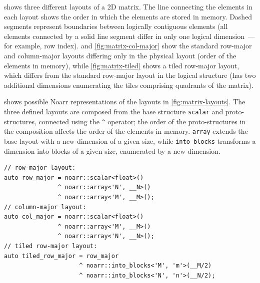  shows three different layouts of a 2D matrix.
The line connecting the elements in each layout shows the order in which the elements are stored in memory. Dashed segments represent boundaries between logically contiguous elements (all elements connected by a solid line segment differ in only one logical dimension~--- for example, row index).
 and \cref{fig:matrix-col-major} show the standard row-major and column-major layouts differing only in the physical layout (order of the elements in memory), while \cref{fig:matrix-tiled} shows a tiled row-major layout, which differs from the standard row-major layout in the logical structure (has two additional dimensions enumerating the tiles comprising quadrants of the matrix).


 shows possible Noarr representations of the layouts in \cref{fig:matrix-layouts}. The three defined layouts are composed from the base structure \lstinline{scalar} and proto-structures, connected using the \lstinline{^} operator; the order of the proto-structures in the composition affects the order of the elements in memory. \lstinline{array} extends the base layout with a new dimension of a given size, while \lstinline{into_blocks} transforms a dimension into blocks of a given size, enumerated by a new dimension.

\begin{lstlisting}[style=C++, caption={Noarr representations of the layouts in \cref{fig:matrix-layouts}}, label={lst:matrix-layouts}]
// row-major layout:
auto row_major = noarr::scalar<float>()
               ^ noarr::array<'N', __N>()
               ^ noarr::array<'M', __M>();
// column-major layout:
auto col_major = noarr::scalar<float>()
               ^ noarr::array<'M', __M>()
               ^ noarr::array<'N', __N>();
// tiled row-major layout:
auto tiled_row_major = row_major
                     ^ noarr::into_blocks<'M', 'm'>(__M/2)
                     ^ noarr::into_blocks<'N', 'n'>(__N/2);
\end{lstlisting}

